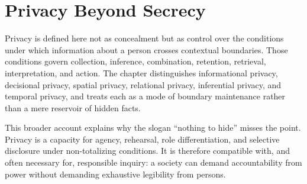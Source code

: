 
\chapter{Privacy Beyond Secrecy}
\label{ch:ch029}

Privacy is defined here not as concealment but as control over the conditions under which information about a person crosses contextual boundaries. Those conditions govern collection, inference, combination, retention, retrieval, interpretation, and action. The chapter distinguishes informational privacy, decisional privacy, spatial privacy, relational privacy, inferential privacy, and temporal privacy, and treats each as a mode of boundary maintenance rather than a mere reservoir of hidden facts.

This broader account explains why the slogan ``nothing to hide'' misses the point. Privacy is a capacity for agency, rehearsal, role differentiation, and selective disclosure under non-totalizing conditions. It is therefore compatible with, and often necessary for, responsible inquiry: a society can demand accountability from power without demanding exhaustive legibility from persons.
